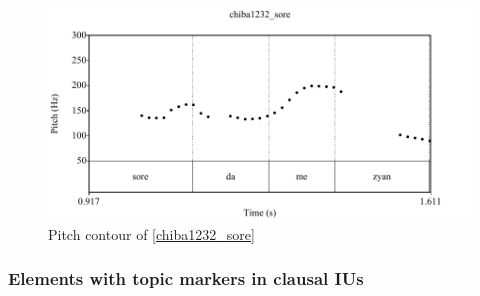 \begin{figure}
	\begin{center}
	\includegraphics[width=.95\textwidth]{sounds/chiba1232_sore.pdf}
	\caption{Pitch contour of \ref{chiba1232_sore}}
	\label{chiba1232_soreF}
	\end{center}
\end{figure}



\subsubsection{Elements with topic markers in clausal IUs}\label{TopCIU}

